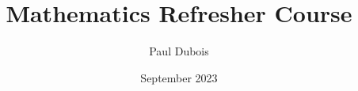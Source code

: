 \documentclass[a4paper,12pt]{book}
\begin{document}
	
	\author{Paul Dubois}
	\title{Mathematics Refresher Course}
	\date{September 2023}
	
	\frontmatter
	\maketitle
	\tableofcontents
	

	

	
	
\end{document}
